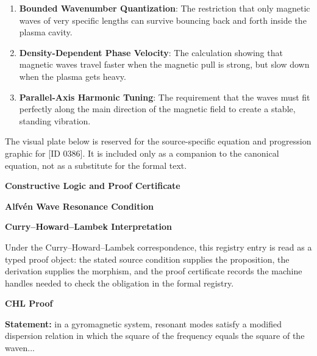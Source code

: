 \begin{enumerate}[leftmargin=1.6em,itemsep=6pt,topsep=4pt]
\item \textbf{Bounded Wavenumber Quantization}: The restriction that only magnetic waves of very specific lengths can survive bouncing back and forth inside the plasma cavity.
\item \textbf{Density-Dependent Phase Velocity}: The calculation showing that magnetic waves travel faster when the magnetic pull is strong, but slow down when the plasma gets heavy.
\item \textbf{Parallel-Axis Harmonic Tuning}: The requirement that the waves must fit perfectly along the main direction of the magnetic field to create a stable, standing vibration.
\end{enumerate}

\begingroup\footnotesize\sloppy
The visual plate below is reserved for the source-specific equation and progression graphic for [ID 0386]. It is included only as a companion to the canonical equation, not as a substitute for the formal text.
\par\endgroup
\ifTZPDarkEdition
{}
\fi

\clearpage
\begingroup\tzpsupportsetup
\noindent\textbf{\fontsize{10.8pt}{12.8pt}\selectfont [ID 0386] Constructive Logic and Proof Certificate}\par
\noindent\textbf{\fontsize{10pt}{12pt}\selectfont Alfv\'en Wave Resonance Condition}\par
\vspace{0.45em}
\begingroup
\footnotesize
\setlength{\parskip}{0.22em}
\setlength{\parindent}{0pt}
\noindent\textbf{Curry--Howard--Lambek Interpretation}\par
Under the Curry--Howard--Lambek correspondence, this registry entry is read as a typed proof
object: the stated source condition supplies the proposition, the derivation supplies the
morphism, and the proof certificate records the machine handles needed to check the obligation
in the formal registry.

\vspace{0.45em}
\noindent\textbf{CHL Proof}\par
\textbf{Statement:} in a gyromagnetic system, resonant modes satisfy a modified dispersion relation in which
the square of the frequency equals the square of the waven...

